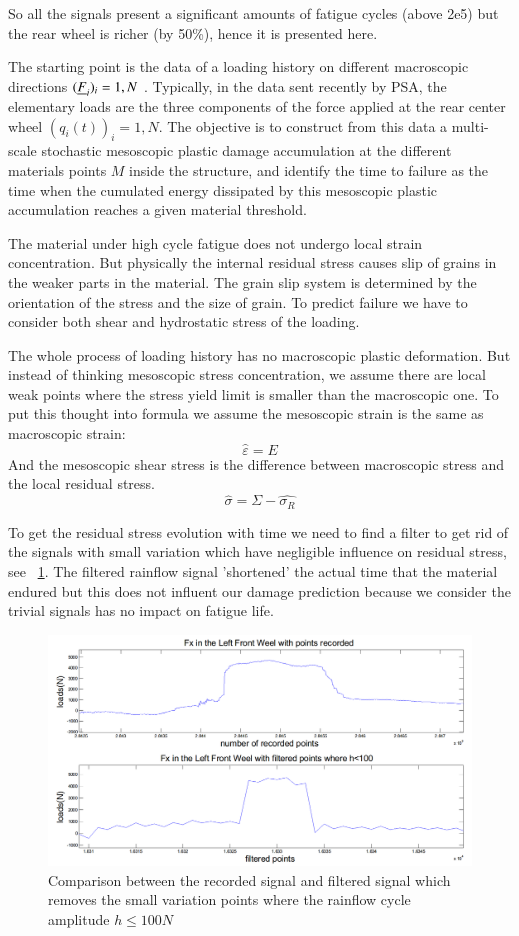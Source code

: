 \documentclass[3p,times,procedia,number]{elsarticle}
\newcommand{\figref}[1]{\figurename~\ref{#1}}
\begin{document}
So all the signals present a significant amounts of fatigue cycles (above 2e5) but the rear wheel is richer (by 50\%), hence it is presented here.

The starting point is the data of a loading history on different macroscopic directions $(\uline{F}_i)_i=1,N$ . Typically, in the data sent recently by PSA, the elementary loads are the three components of the force applied at the rear center wheel  $(q_i(t))_i=1,N$. The objective is to construct from this data a multi-scale stochastic mesoscopic plastic damage accumulation at the different materials points $M$ inside the structure, and identify the time to failure as the time when the cumulated energy dissipated by this mesoscopic plastic accumulation reaches a given material threshold.

The material under high cycle fatigue does not undergo local strain concentration. But physically the internal residual stress causes slip of grains in the weaker parts in the material. The grain slip system is determined by the orientation of the stress and the size of grain. To predict failure we have to consider both shear and hydrostatic stress of the loading.

The whole process of loading history has no macroscopic plastic deformation. But instead of thinking mesoscopic stress concentration, we assume there are local weak points where the stress yield limit is smaller than the macroscopic one. To put this thought into formula we assume the mesoscopic strain is the same as macroscopic strain:
$$\hat{\varepsilon}=E$$
And the mesoscopic shear stress is the difference between macroscopic stress and the local residual stress.
$$\hat{\sigma}=\Sigma-\hat{\sigma_R}$$

To get the residual stress evolution with time we need to find a filter to get rid of the  signals with small variation which have negligible influence on residual stress, see \figref{filtered}. The filtered rainflow signal 'shortened' the actual time that the material endured but this does not influent our damage prediction because we consider the trivial signals has no impact on fatigue life.

\begin{figure}[h!]
	\centering
	\includegraphics[width=\textwidth]{figures//filtered.png} 
	\caption{Comparison between the recorded signal and filtered signal which removes the small variation points where the rainflow cycle amplitude $h\leqslant 100N$}
	\label{filtered}
\end{figure}
\end{document}
